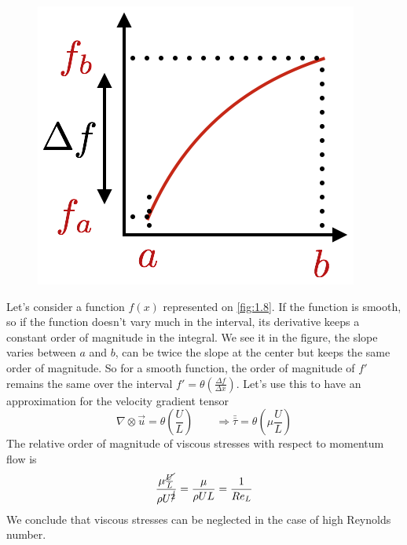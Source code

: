 		\begin{figure}
		\vspace{-5mm}
		\includegraphics[scale=0.5]{ch1/8}
		\label{fig:1.8}
		\end{figure}
		Let's consider a function $f(x)$ represented on \autoref{fig:1.8}. If the function is smooth, so if the function doesn't vary much in the interval, its derivative keeps a constant order of magnitude in the integral. We see it in the figure, the slope varies between $a$ and $b$, can be twice the slope at the center but keeps the same order of magnitude. So for a smooth function, the order of magnitude of $f'$ remains the same over the interval $f' = \theta \left(\frac{\Delta f}{\Delta x}\right)$. Let's use this to have an approximation for the velocity gradient tensor 
		\begin{equation}
			\nabla \otimes \vec{u} = \theta \left( \frac{U}{L} \right) \qquad \Rightarrow \bar{\bar{\tau}} = \theta \left( \mu \frac{U}{L} \right)
		\end{equation}
		The relative order of magnitude of viscous stresses with respect to momentum flow is 
		\begin{equation}
			\frac{\mu \frac{\cancel{U}}{L}}{\rho U^{\cancel{2}}} = \frac{\mu}{\rho UL} = \frac{1}{Re_L}
		\end{equation}
		We conclude that viscous stresses can be neglected in the case of high Reynolds number. \\
		
